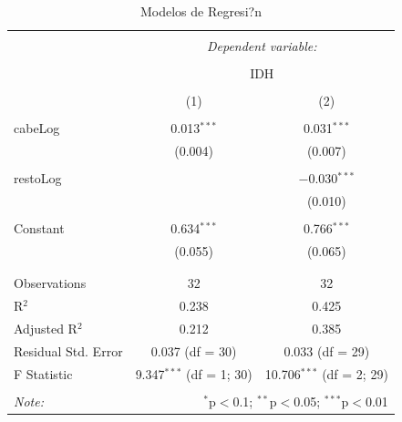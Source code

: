 \documentclass{article}
\begin{document}
\begin{table}[!htbp] \centering 
  \caption{Modelos de Regresi?n} 
  \label{regresiones} 
\begin{tabular}{@{\extracolsep{5pt}}lcc} 
\\[-1.8ex]\hline 
\hline \\[-1.8ex] 
 & \multicolumn{2}{c}{\textit{Dependent variable:}} \\ 
\cline{2-3} 
\\[-1.8ex] & \multicolumn{2}{c}{IDH} \\ 
\\[-1.8ex] & (1) & (2)\\ 
\hline \\[-1.8ex] 
 cabeLog & 0.013$^{***}$ & 0.031$^{***}$ \\ 
  & (0.004) & (0.007) \\ 
  & & \\ 
 restoLog &  & $-$0.030$^{***}$ \\ 
  &  & (0.010) \\ 
  & & \\ 
 Constant & 0.634$^{***}$ & 0.766$^{***}$ \\ 
  & (0.055) & (0.065) \\ 
  & & \\ 
\hline \\[-1.8ex] 
Observations & 32 & 32 \\ 
R$^{2}$ & 0.238 & 0.425 \\ 
Adjusted R$^{2}$ & 0.212 & 0.385 \\ 
Residual Std. Error & 0.037 (df = 30) & 0.033 (df = 29) \\ 
F Statistic & 9.347$^{***}$ (df = 1; 30) & 10.706$^{***}$ (df = 2; 29) \\ 
\hline 
\hline \\[-1.8ex] 
\textit{Note:}  & \multicolumn{2}{r}{$^{*}$p$<$0.1; $^{**}$p$<$0.05; $^{***}$p$<$0.01} \\ 
\end{tabular} 
\end{table} 
\end{document}
